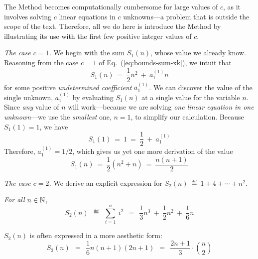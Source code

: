 \bigskip

\noindent {}
\bigskip

The Method becomes computationally cumbersome for large values of $c$, as it involves solving $c$ linear equations in $c$ unknowns---a problem that is outside the scope of the text.  Therefore, all we do here is introduce the Method by illustrating its use with the first few positive integer values of $c$.

\medskip

{\it The case $c=1$.}
%
We begin with the sum $S_1(n)$, whose value we already know.  Reasoning from the case $c=1$ of Eq.~(\ref{eq:bounds-sum-xk}), we intuit that
\[ S_1(n) \ = \ \frac{1}{2} n^2 \ + \ a^{(1)}_1 n \]
for some positive {\it undetermined coefficient} $a^{(1)}_1$.  We can discover the value of the single unknown, $a^{(1)}_1$ by evaluating $S_1(n)$ at a single value for the variable $n$.  Since {\em any} value of $n$ will work---because we are solving {\em one linear equation in one unknown}---we use the {\em smallest} one, $n=1$, to simplify our calculation.  Because $S_1(1) = 1$, we have
\[ S_1(1) \ = \ 1 \ = \ \frac{1}{2} \ + \ a^{(1)}_1 \]
Therefore, $a^{(1)}_1 = 1/2$, which gives us yet one more derivation of the value
\[ S_1(n) \ = \ \frac{1}{2} \left( n^2 + n \right) \ = \  \frac{n(n+1)}{2} \]

\medskip

{\it The case $c=2$.}
%
We derive an explicit expression for $S_2(n) \ \eqdef \  1 + 4 + \cdots + n^2$.

\begin{prop}
\label{thm:summing-squares}
{\em For all} $n \in \mathbb{N}$,
\begin{equation}
\label{eq:sum-1-to-nsq}
S_2(n) \ \ \eqdef \ \ \sum_{i=1}^n \ i^2 
\ \ = \ \ \frac{1}{3} n^3 \ + \ \frac{1}{2} n^2 \ + \ \frac{1}{6} n
\end{equation}
\end{prop}

\noindent
$S_2(n)$ is often expressed in a more aesthetic form:
\[ S_2(n) \ \ = \ \
\frac{1}{6} n (n+1)(2n+1) \ \  = \ \
\frac{2n+1}{3} \cdot {n \choose 2}
\]

